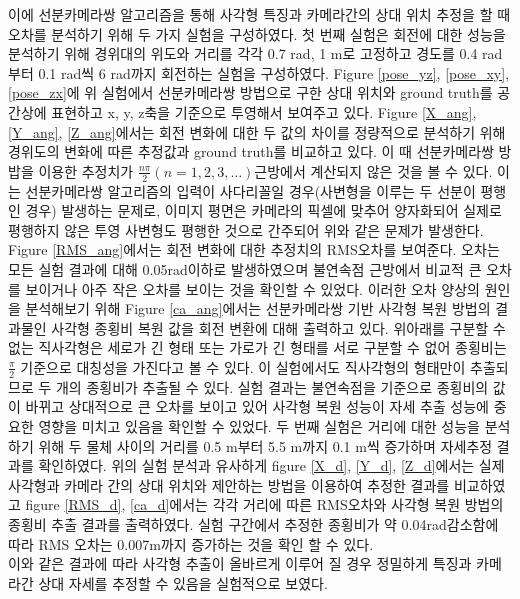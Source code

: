 \documentclass[master,korean,final]{cbnu-ecs}
\begin{document}
 이에 선분카메라쌍 알고리즘을 통해 사각형 특징과 카메라간의 상대 위치 추정을 할 때 오차를 분석하기 위해 두 가지 실험을 구성하였다. 첫 번째 실험은 회전에 대한 성능을 분석하기 위해 경위대의 위도와 거리를 각각 0.7 rad, 1 m로 고정하고 경도를 0.4 rad부터 0.1 rad씩 6 rad까지 회전하는 실험을 구성하였다. Figure \ref{pose_yz}, \ref{pose_xy}, \ref{pose_zx}에 위 실험에서 선분카메라쌍 방법으로 구한 상대 위치와 ground truth를 공간상에 표현하고 x, y, z축을 기준으로 투영해서 보여주고 있다. Figure \ref{X_ang}, \ref{Y_ang}, \ref{Z_ang}에서는 회전 변화에 대한 두 값의 차이를 정량적으로 분석하기 위해 경위도의 변화에 따른 추정값과 ground truth를 비교하고 있다. 이 때 선분카메라쌍 방밥을 이용한 추정치가 $\frac{n\pi}{2}( n=1,2,3,\dots)$근방에서 계산되지 않은 것을 볼 수 있다. 이는 선분카메라쌍 알고리즘의 입력이 사다리꼴일 경우(사변형을 이루는 두 선분이 평행인 경우) 발생하는 문제로, 이미지 평면은 카메라의 픽셀에 맞추어 양자화되어 실제로 평행하지 않은 투영 사변형도 평행한 것으로 간주되어 위와 같은 문제가 발생한다. Figure \ref{RMS_ang}에서는 회전 변화에 대한 추정치의 RMS오차를 보여준다. 오차는 모든 실험 결과에 대해 0.05rad이하로 발생하였으며 불연속점 근방에서 비교적 큰 오차를 보이거나 아주 작은 오차를 보이는 것을 확인할 수 있었다. 이러한 오차 양상의 원인을 분석해보기 위해 Figure \ref{ca_ang}에서는 선분카메라쌍 기반 사각형 복원 방법의 결과물인 사각형 종횡비 복원 값을 회전 변환에 대해 출력하고 있다. 위아래를 구분할 수 없는 직사각형은 세로가 긴 형태 또는 가로가 긴 형태를 서로 구분할 수 없어 종횡비는 $\frac{\pi}{2}$ 기준으로 대칭성을 가진다고 볼 수 있다. 이 실험에서도 직사각형의 형태만이 추출되므로 두 개의 종횡비가 추출될 수 있다. 실험 결과는 불연속점을 기준으로 종횡비의 값이 바뀌고 상대적으로 큰 오차를 보이고 있어 사각형 복원 성능이 자세 추출 성능에 중요한 영향을 미치고 있음을 확인할 수 있었다.
 두 번째 실험은 거리에 대한 성능을 분석하기 위해 두 물체 사이의 거리를 0.5 m부터 5.5 m까지 0.1 m씩 증가하며 자세추정 결과를 확인하였다. 위의 실험 분석과 유사하게 figure \ref{X_d}, \ref{Y_d}, \ref{Z_d}에서는 실제 사각형과 카메라 간의 상대 위치와 제안하는 방법을 이용하여 추정한 결과를 비교하였고 figure \ref{RMS_d}, \ref{ca_d}에서는 각각 거리에 따른 RMS오차와 사각형 복원 방법의 종횡비 추출 결과를 출력하였다. 실험 구간에서 추정한 종횡비가 약 0.04rad감소함에 따라 RMS 오차는 0.007m까지 증가하는 것을 확인 할 수 있다. \\
이와 같은 결과에 따라 사각형 추출이 올바르게 이루어 질 경우 정밀하게 특징과 카메라간 상대 자세를 추정할 수 있음을 실험적으로 보였다.
\end{document}
